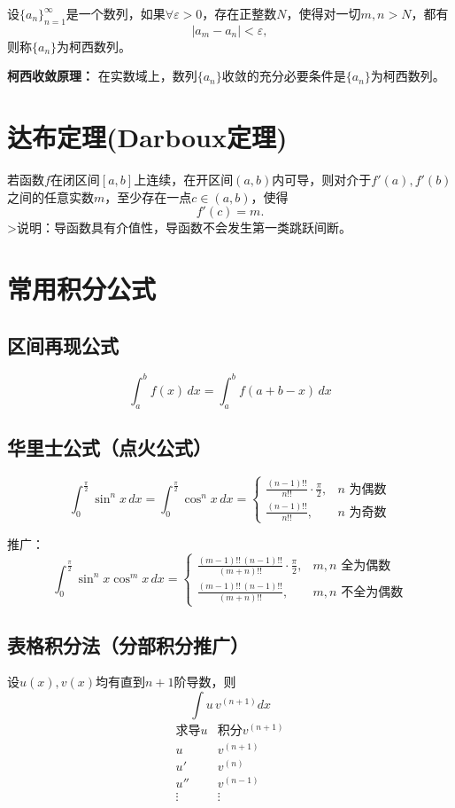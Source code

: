 设$\{a_n\}_{n=1}^{\infty}$是一个数列，如果$\forall \varepsilon>0$，存在正整数$N$，使得对一切$m,n>N$，都有
\[
|a_m - a_n|<\varepsilon,
\]
则称$\{a_n\}$为柯西数列。

\textbf{柯西收敛原理：} 在实数域上，数列$\{a_n\}$收敛的充分必要条件是$\{a_n\}$为柯西数列。

\section{达布定理(Darboux定理)}
若函数$f$在闭区间$[a,b]$上连续，在开区间$(a,b)$内可导，则对介于$f'(a),f'(b)$之间的任意实数$m$，至少存在一点$c\in(a,b)$，使得
\[
f'(c)=m.
\]
>说明：导函数具有介值性，导函数不会发生第一类跳跃间断。

\section{常用积分公式}
\subsection{区间再现公式}
\[
\int_a^b f(x)\,dx=\int_a^b f(a+b-x)\,dx
\]

\subsection{华里士公式（点火公式）}
\[
\int_{0}^{\frac{\pi}{2}} \sin^n x \, dx = \int_{0}^{\frac{\pi}{2}} \cos^n x \, dx
=
\begin{cases}
\displaystyle \frac{(n-1)!!}{n!!} \cdot \frac{\pi}{2}, & n\text{ 为偶数} \\[6pt]
\displaystyle \frac{(n-1)!!}{n!!}, & n\text{ 为奇数}
\end{cases}
\]

推广：
\[
\int_{0}^{\frac{\pi}{2}} \sin^n x \cos^m x \, dx
=
\begin{cases}
\displaystyle\frac{(m-1)!!\,(n-1)!!}{(m+n)!!}\cdot \frac{\pi}{2}, & m,n\text{ 全为偶数}\\[6pt]
\displaystyle\frac{(m-1)!!\,(n-1)!!}{(m+n)!!}, & m,n\text{ 不全为偶数}
\end{cases}
\]

\subsection{表格积分法（分部积分推广）}
设$u(x),v(x)$均有直到$n+1$阶导数，则
\[
\int u\, v^{(n+1)} dx
\]
\[
\begin{array}{c|c}
\text{求导}u & \text{积分}v^{(n+1)} \\
\hline
u & v^{(n+1)} \\
u' & v^{(n)} \\
u'' & v^{(n-1)} \\
\vdots & \vdots
\end{array}
\]

